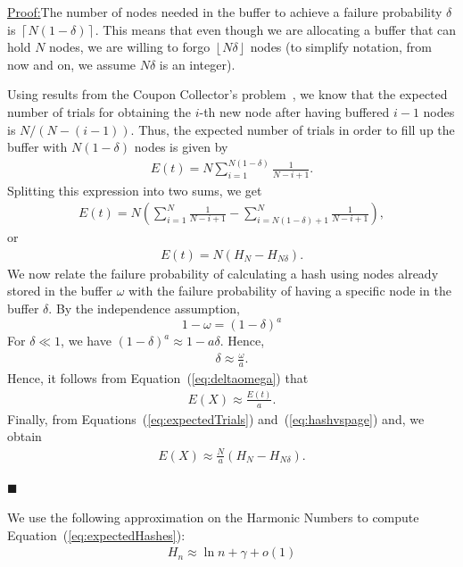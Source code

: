 \documentclass[runningheads]{llncs}
\newenvironment{claimproof}[1]{\par\noindent\underline{Proof:}\space#1}{\hfill $\blacksquare$}
\begin{document}
\begin{claimproof}
The number of nodes needed in the buffer to achieve a failure probability $\delta$ is 
$\left \lceil{N(1-\delta)}\right \rceil$.
This means that even though we are allocating a buffer that can hold $N$ nodes, we are willing to forgo $\left \lfloor{N\delta}\right \rfloor$ nodes (to simplify notation, from now and on, we assume $N\delta$ is an integer).  

Using results from the Coupon Collector's problem~\cite{couponCollector}, we know that the expected number of trials for obtaining the $i$-th new node after having buffered $i-1$ nodes is $N/(N-(i-1))$.
Thus, the expected number of trials in order to fill up the buffer with ${N(1-\delta)}$ nodes is given by
\begin{gather}
	E(t) = N\sum_{i=1}^{N(1-\delta)} \frac{1}{N-i+1}.
\end{gather}
Splitting this expression into two sums, we get
\begin{gather}
	E(t) = N \left(\sum_{i=1}^{N}\frac{1}{N-i+1} - \sum_{i=N(1-\delta)+1}^{N}\frac{1}{N-i+1} \right), 
\end{gather}    
or
\begin{gather}
    \label{eq:expectedTrials}
    E(t) = N(H_{N} -H_{N\delta}).
\end{gather}
We now relate the failure probability  of calculating a hash using nodes already stored in the buffer  $\omega$ with the failure probability of having a specific node in the buffer $\delta$. By the independence assumption,
$$ 1-\omega = (1-\delta)^a$$For $\delta \ll 1$, we have $(1-\delta)^a \approx 1-a\delta$. Hence,
\begin{gather}
    \label{eq:deltaomega}
	\delta \approx \frac{\omega}{a}.
\end{gather}
Hence, it follows from Equation~(\ref{eq:deltaomega}) that 
\begin{gather}
	\label{eq:hashvspage}
	E(X) \approx \frac{E(t)}{a}.
\end{gather}
Finally, from Equations~(\ref{eq:expectedTrials}) and~(\ref{eq:hashvspage}) and, we obtain
\begin{gather}
    \label{eq:expectedHashes}
	E(X) \approx \frac{N}{a}(H_{N} -H_{N\delta}).
\end{gather}

\end{claimproof}

We use the following approximation on the Harmonic Numbers to compute  Equation~(\ref{eq:expectedHashes}):
\begin{gather}
    \label{eq:boundHarmonic}
    H_n \approx \ln{n} + \gamma + o(1)
\end{gather}
\end{document}
